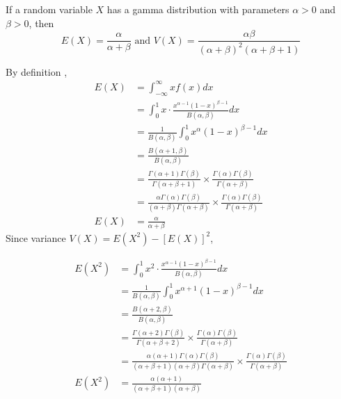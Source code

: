 \begin{theorem}
    If a random variable $X$ has a gamma distribution with parameters $\alpha > 0$  and $\beta > 0$, then
    \[
    E(X) = \frac{\alpha}{\alpha + \beta} \text{ and } 
    V(X) = \frac{\alpha\beta}{(\alpha + \beta)^2(\alpha + \beta + 1)}
    \]
\end{theorem}
\begin{theorem}
    By definition ,
    \begin{align*}
        E(X) &= \int_{-\infty}^{\infty} xf(x) dx \\
        &= \int^{1}_{0} x \cdot \frac{x^{\alpha - 1}(1 - x)^{\beta - 1}}{B(\alpha, \beta)} dx \\
        &= \frac{1}{B(\alpha, \beta)} \int^{1}_{0} x^\alpha(1 - x)^{\beta - 1} dx \\
        &= \frac{B(\alpha + 1, \beta)}{B(\alpha, \beta)} \\
        &= \frac{\Gamma(\alpha + 1)\Gamma(\beta)}{\Gamma(\alpha + \beta + 1)}   \times \frac{\Gamma(\alpha)\Gamma(\beta)}{\Gamma(\alpha + \beta)} \\
        &= \frac{\alpha \Gamma(\alpha)\Gamma(\beta)}{(\alpha + \beta)\Gamma(\alpha + \beta )}   \times \frac{\Gamma(\alpha)\Gamma(\beta)}{\Gamma(\alpha + \beta)} \\
        E(X) &= \frac{\alpha}{\alpha + \beta}
    \end{align*}
    Since variance $V(X) = E(X^2) - [E(X)]^2$,

    \begin{align*}
        E(X^2) &= \int^{1}_{0} x^2 \cdot \frac{x^{\alpha - 1}(1 - x)^{\beta - 1}}{B(\alpha, \beta)} dx \\
        &= \frac{1}{B(\alpha, \beta)} \int^{1}_{0} x^{\alpha + 1}(1 - x)^{\beta - 1} dx \\ 
        &= \frac{B(\alpha + 2, \beta)}{B(\alpha, \beta)} \\
        &= \frac{\Gamma(\alpha + 2)\Gamma(\beta)}{\Gamma(\alpha + \beta + 2)}   \times \frac{\Gamma(\alpha)\Gamma(\beta)}{\Gamma(\alpha + \beta)} \\
        &= \frac{\alpha(\alpha + 1)\Gamma(\alpha)\Gamma(\beta)}{(\alpha + \beta + 1)(\alpha + \beta)\Gamma(\alpha + \beta)}   \times \frac{\Gamma(\alpha)\Gamma(\beta)}{\Gamma(\alpha + \beta)} \\
        E(X^2) &= \frac{\alpha(\alpha + 1)}{(\alpha + \beta + 1)(\alpha + \beta)}
    \end{align*}


\end{theorem}
